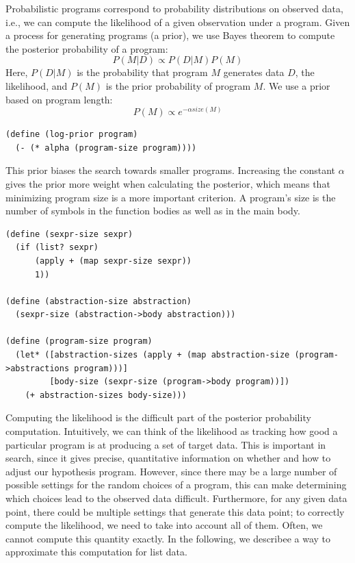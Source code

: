 \documentclass[a4paper,10pt]{article}
\begin{document}
Probabilistic programs correspond to probability distributions on observed data, i.e., we can compute the likelihood of a given observation under a program. Given a process for generating programs (a prior), we use Bayes theorem to compute the posterior probability of a program:
\begin{equation}P(M|D)\propto P(D|M)P(M)\end{equation}
Here, $P(D|M)$ is the probability that program $M$ generates data $D$, the likelihood, and $P(M)$ is the prior probability of program $M$. We use a prior based on program length:
\begin{equation}P(M)\propto e^{-\alpha \mathit{size}(M)}\end{equation}
\begin{lstlisting}[frame=trbl]
(define (log-prior program)
  (- (* alpha (program-size program))))
\end{lstlisting}
This prior biases the search towards smaller programs. Increasing the constant $\alpha$ gives the prior more weight when calculating the posterior, which means that minimizing program size is a more important criterion. A program's size is the number of symbols in the function bodies as well as in the main body.
\begin{lstlisting}[frame=trbl]
(define (sexpr-size sexpr)
  (if (list? sexpr)
      (apply + (map sexpr-size sexpr))
      1))

(define (abstraction-size abstraction)
  (sexpr-size (abstraction->body abstraction)))
  
(define (program-size program)
  (let* ([abstraction-sizes (apply + (map abstraction-size (program->abstractions program)))]
         [body-size (sexpr-size (program->body program))])
    (+ abstraction-sizes body-size)))
\end{lstlisting}
Computing the likelihood is the difficult part of the posterior probability computation. Intuitively, we can think of the likelihood as tracking how good a particular program is at producing a set of target data.  This is important in search, since it gives precise, quantitative information on whether and how to adjust our hypothesis program. However, since there may be a large number of possible settings for the random choices of a program, this can make determining which choices lead to the observed data difficult. Furthermore, for any given data point, there could be multiple settings that generate this data point; to correctly compute the likelihood, we need to take into account all of them. Often, we cannot compute this quantity exactly. In the following, we describee a way to approximate this computation for list data.
\end{document}
